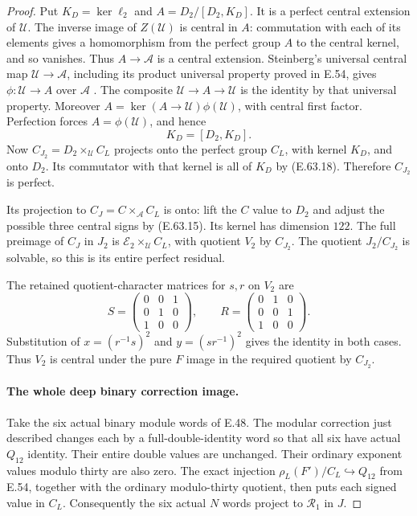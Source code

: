 \begin{proof}
Put $K_D=\ker\ell_2$ and
$A=D_2/[D_2,K_D]$. It is a perfect central extension
of $\mathcal U$. The inverse image of $Z(\mathcal U)$
is central in $A$: commutation with each of its
elements gives a homomorphism from the perfect group
$A$ to the central kernel, and so vanishes.
Thus $A\to\mathcal A$ is a central extension.
Steinberg's universal central map
$\mathcal U\to\mathcal A$, including its product
universal property proved in E.54, gives
$\phi:\mathcal U\to A$ over $\mathcal A$
\cite[\S7, Theorem 10 and Corollary 2(b)]{DE_Steinberg1967}.
The composite $\mathcal U\to A\to\mathcal U$ is
the identity by that universal property. Moreover
$A=\ker(A\to\mathcal U)\phi(\mathcal U)$, with
central first factor. Perfection forces
$A=\phi(\mathcal U)$, and hence
\[
                         K_D=[D_2,K_D].
 \tag{E.63.18}
\]
Now $C_{J_2}=D_2\times_{\mathcal U}C_L$ projects
onto the perfect group $C_L$, with kernel $K_D$,
and onto $D_2$. Its commutator with that kernel
is all of $K_D$ by \textup{(E.63.18)}. Therefore
$C_{J_2}$ is perfect.

Its projection to $C_J=C\times_{\mathcal A}C_L$
is onto: lift the $C$ value to $D_2$ and adjust
the possible three central signs by
\textup{(E.63.15)}. Its kernel has dimension $122$.
The full preimage of $C_J$ in $J_2$ is
$\mathcal E_2\times_{\mathcal U}C_L$, with quotient
$V_2$ by $C_{J_2}$. The quotient $J_2/C_{J_2}$ is
solvable, so this is its entire perfect residual.

The retained quotient-character matrices for $s,r$
on $V_2$ are
\[
 S=\begin{pmatrix}0&0&1\\0&1&0\\1&0&0\end{pmatrix},
 \qquad
 R=\begin{pmatrix}0&1&0\\0&0&1\\1&0&0\end{pmatrix}.
 \tag{E.63.19}
\]
Substitution of $x=(r^{-1}s)^2$ and $y=(sr^{-1})^2$
gives the identity in both cases. Thus $V_2$ is
central under the pure $F$ image in the required
quotient by $C_{J_2}$.

\paragraph{The whole deep binary correction image.}
Take the six actual binary module words of E.48.
The modular correction just described changes
each by a full-double-identity word so that all
six have actual $Q_{12}$ identity. Their entire
double values are unchanged. Their ordinary
exponent values modulo thirty are also zero.
The exact injection
$\rho_L(F')/C_L\hookrightarrow Q_{12}$ from E.54,
together with the ordinary modulo-thirty quotient,
then puts each signed value in $C_L$.
Consequently the six actual $N$ words project to
$\mathcal R_1$ in $J$.


\end{proof}
